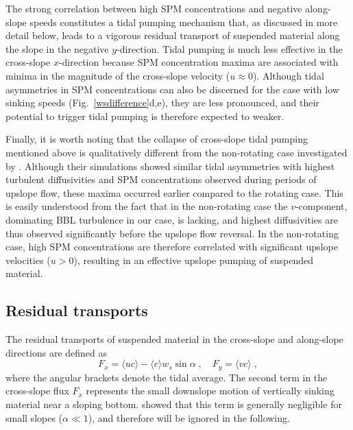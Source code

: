 The strong correlation between high SPM concentrations and negative
along-slope speeds constitutes a tidal pumping mechanism that, as
discussed in more detail below, leads to a vigorous residual transport
of suspended material along the slope in the negative
$y$-direction. Tidal pumping is much less effective in the cross-slope
$x$-direction because SPM concentration maxima are associated with
minima in the magnitude of the cross-slope velocity ($u \approx
0$). Although tidal asymmetries in SPM concentrations can also be
discerned for the case with low sinking speeds
(Fig.\ \ref{wsdifference}d,e), they are less pronounced, and their
potential to trigger tidal pumping is therefore expected to weaker.

Finally, it is worth noting that the collapse of cross-slope tidal
pumping mentioned above is qualitatively different from the
non-rotating case investigated by \cite{schulzumlauf2016}. Although
their simulations showed similar tidal asymmetries with highest
turbulent diffusivities and SPM concentrations observed during periods
of upslope flow, these maxima occurred earlier compared to the rotating
case. This is easily understood from the fact that in the non-rotating
case the $v$-component, dominating BBL turbulence in our case, is
lacking, and highest diffusivities are thus observed significantly
before the upslope flow reversal. In the non-rotating case, high SPM
concentrations are therefore correlated with significant upslope
velocities ($u>0$), resulting in an effective upslope pumping of
suspended material.


\subsection{Residual transports}\label{residualtransports}
The residual transports of suspended material in the cross-slope and
along-slope directions are defined as
\begin{equation}
  \label{FxFy}
  F_x = \langle u c \rangle - \langle c \rangle w_s \sin \alpha \; , \quad
  F_y = \langle v c \rangle \; ,  
\end{equation}
where the angular brackets denote the tidal average. The second term
in the cross-slope flux $F_x$ represents the small downslope motion of
vertically sinking material near a sloping
bottom. \cite{schulzumlauf2016} showed that this term is generally
negligible for small slopes ($\alpha \ll 1$), and therefore will be
ignored in the following.

